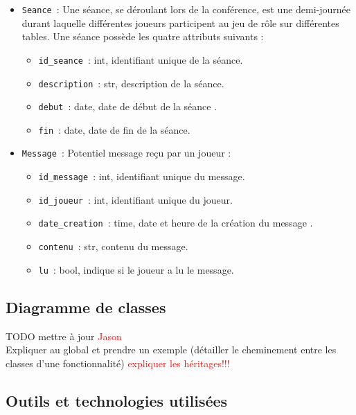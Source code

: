 \documentclass[11pt]{article}
\begin{document}
\begin{itemize}
    \item \texttt{Seance}~: Une séance, se déroulant lors de la conférence, est une demi-journée durant laquelle différentes joueurs participent au jeu de rôle sur différentes tables. Une séance possède les quatre attributs suivants :
    \begin{itemize}[label=, font=\small]
        \item \texttt{id\_seance}~: int, identifiant unique de la séance.
        \item \texttt{description}~: str, description de la séance.
        \item \texttt{debut}~: date, date de début de la séance .
        \item \texttt{fin}~: date, date de fin de la séance.
    \end{itemize}
    
    \item \texttt{Message}~: Potentiel message reçu par un joueur  :
    \begin{itemize}[label=, font=\small]
        \item \texttt{id\_message}~: int, identifiant unique du message.
        \item \texttt{id\_joueur}~: int, identifiant unique du joueur.
        \item \texttt{date\_creation}~: time, date et heure de la création du message .
        \item \texttt{contenu}~: str, contenu du message.
        \item \texttt{lu}~: bool, indique si le joueur a lu le message.
    \end{itemize}
    
\end{itemize}




\subsection{Diagramme de classes}

TODO mettre à jour \textcolor{red}{Jason} \\
Expliquer au global et prendre un exemple (détailler le cheminement entre les classes d'une fonctionnalité) 
\textcolor{red}{expliquer les héritages!!!}





\subsection{Outils et technologies utilisées}
\end{document}
